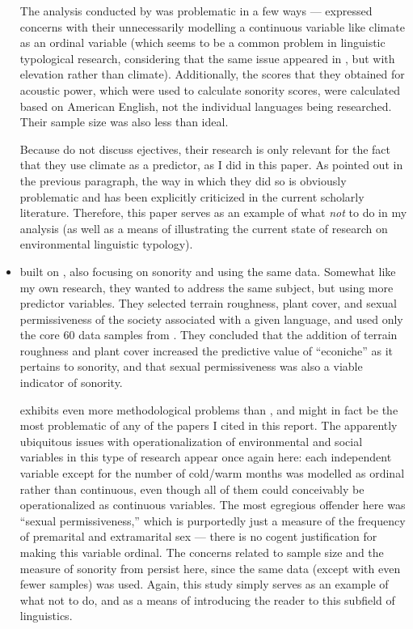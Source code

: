 \documentclass{article}
\begin{document}
\begin{itemize}
The analysis conducted by \textcite{fought2004} was problematic in a few ways --- \textcite{haynie2014} expressed concerns with their unnecessarily modelling a continuous variable like climate as an ordinal variable (which seems to be a common problem in linguistic typological research, considering that the same issue appeared in \textcite{everett2013}, but with elevation rather than climate). Additionally, the scores that they obtained for acoustic power, which were used to calculate sonority scores, were calculated based on American English, not the individual languages being researched. Their sample size was also less than ideal.

Because \textcite{fought2004} do not discuss ejectives, their research is only relevant for the fact that they use climate as a predictor, as I did in this paper. As pointed out in the previous paragraph, the way in which they did so is obviously problematic and has been explicitly criticized in the current scholarly literature. Therefore, this paper serves as an example of what \emph{not} to do in my analysis (as well as a means of illustrating the current state of research on environmental linguistic typology). 

\item \textbf{}

\textcite{ember2007} built on \textcite{fought2004}, also focusing on sonority and using the same data. Somewhat like my own research, they wanted to address the same subject, but using more predictor variables. They selected terrain roughness, plant cover, and sexual permissiveness of the society associated with a given language, and used only the core 60 data samples from \textcite{fought2004}. They concluded that the addition of terrain roughness and plant cover increased the predictive value of ``econiche'' as it pertains to sonority, and that sexual permissiveness was also a viable indicator of sonority.

\textcite{ember2007} exhibits even more methodological problems than \textcite{fought2004}, and might in fact be the most problematic of any of the papers I cited in this report. The apparently ubiquitous issues with operationalization of environmental and social variables in this type of research appear once again here: each independent variable except for the number of cold/warm months was modelled as ordinal rather than continuous, even though all of them could conceivably be operationalized as continuous variables. The most egregious offender here was ``sexual permissiveness,'' which is purportedly just a measure of the frequency of premarital and extramarital sex --- there is no cogent justification for making this variable ordinal. The concerns related to sample size and the measure of sonority from \textcite{fought2004} persist here, since the same data (except with even fewer samples) was used. Again, this study simply serves as an example of what not to do, and as a means of introducing the reader to this subfield of linguistics.
  
\end{itemize}
\end{document}
